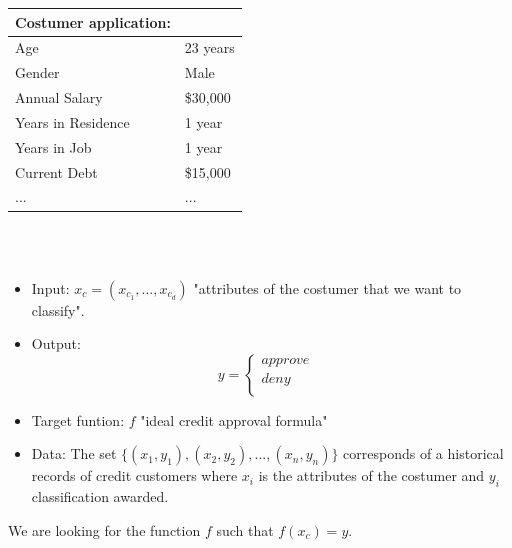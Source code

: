 \documentclass[../main.tex]{subfiles}
\begin{document}
	\begin{tabular}{ll}
		\toprule
		\textbf{Costumer application:}  \\ 
		\midrule
		Age & 23 years \\
		Gender & Male \\
		Annual Salary & \$30,000 \\
		Years in Residence & 1 year \\
		Years in Job & 1 year \\
		Current Debt & \$15,000 \\
		... & ... \\
		\bottomrule
	\end{tabular} 
	\\ \\
	\begin{itemize}
		\item Input: \textbf{$x_c=(x_{c_1},...,x_{c_d})$}  "attributes of the costumer that we want to classify". 
		\item Output:  
		\[
		y = \begin{cases}
			approve \\
			deny& \\
		\end{cases}
		\]
		
		\item Target funtion: $f$  "ideal credit approval formula"
		\item Data: The set $\{(x_1, y_1),(x_2,y_2),...,(x_n ,y_n)\}$ corresponds of a historical records of credit customers where $x_i$ is the attributes of the costumer and $y_i$ classification awarded.
	\end{itemize}
	
	\noindent We are looking for the function $f$ such that $f(x_c)=y$.
	\\ \\ 
	
\end{document}
